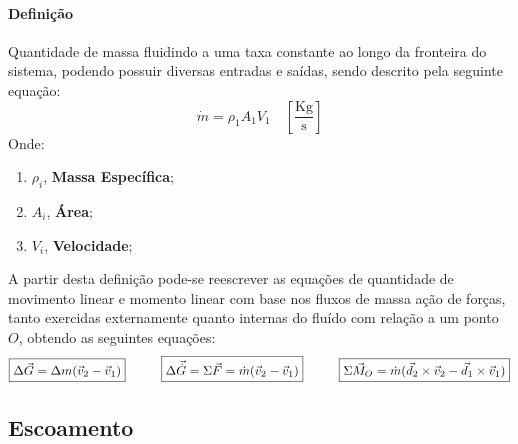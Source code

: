 \documentclass{article}
\begin{document}
            \paragraph{Definição}Quantidade de massa fluidindo a uma taxa constante ao longo da fronteira do sistema, podendo possuir diversas entradas e saídas, sendo descrito pela seguinte equação:
                \begin{equation}
                    \boxed{
                        \dot{m} = \rho_{1} A_{1} V_{1}
                        \quad
                        \left[\frac{\text{Kg}}{\text{s}}\right]
                    }
                \end{equation}
            Onde:
                \begin{enumerate}[rightmargin =\leftmargin, noitemsep]
                    \item $\rho_{i}$, \textbf{Massa Específica};
                    \item $A_{i}$, \textbf{Área};
                    \item $V_{i}$, \textbf{Velocidade};
                \end{enumerate}
            A partir desta definição pode-se reescrever as equações de quantidade de movimento linear e momento linear com base nos fluxos de massa ação de forças, tanto exercidas externamente quanto internas do fluído com relação a um ponto $O$, obtendo as seguintes equações:
                \begin{equation}
                    \boxed{
                        \Delta\vec{G} = \Delta m (\vec{v}_{2} - \vec{v}_{1})
                    }
                    \hspace{10mm}
                    \boxed{
                        \Delta\vec{\dot{G}} = 
                        \Sigma \vec{F} = 
                        \dot{m} (\vec{v}_{2} - \vec{v}_{1})
                    }
                    \hspace{10mm}
                    \boxed{
                        \Sigma \vec{M}_{O} = \dot{m} (\vec{d}_{2}\times\vec{v}_{2} - \vec{d}_{1}\times\vec{v}_{1})
                    }
                \end{equation}

        \subsection{Escoamento}
\end{document}
